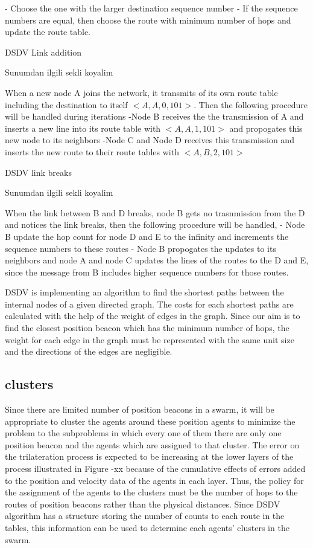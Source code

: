 \documentclass[twoside]{article}
\begin{document}
	- Choose the one with the larger destination sequence number
	- If the sequence numbers are equal, then choose the route with minimum number of hops and update the route table.
	
	DSDV Link addition
	
	Sunumdan ilgili sekli koyalim
	
	When a new node A joins the network, it transmits of its own route table including the destination to itself $<A,A,0,101>$. Then the following procedure will be handled during iterations
	-Node B receives the the transmission of A and inserts a new line into its route table with $<A,A,1,101>$ and propogates this new node to its neighbors
	-Node C and Node D receives this transmission and inserts the new route to their route tables with $<A,B,2,101>$
	
	
	DSDV link breaks
	
	Sunumdan ilgili sekli koyalim
	
	When the link between B and D breaks, node B gets no trasnmission from the D and notices the link breaks, then the following procedure will be handled,
	- Node B update the hop count for node D and E to the infinity and increments the sequence numbers to these routes 
	- Node B propogates the updates to its neighbors and node A and node C updates the lines of the routes to the D and E, since the message from B includes higher sequence numbers for those routes. 
	
	DSDV is implementing an algorithm to find the shortest paths between the internal nodes of a given directed graph. The costs for each shortest paths are calculated with the help of the weight of edges in the graph. Since our aim is to find the closest position beacon which has the minimum number of hops, the weight for each edge in the graph must be represented with the same unit size and the directions of the edges are negligible. 
	\subsection{clusters}
	Since there are limited number of position beacons in a swarm, it will be appropriate to cluster the agents around these position agents to minimize the problem to the subproblems in which every one of them there are only one position beacon and the agents which are assigned to that cluster. The error on the trilateration process is expected to be increasing at the lower layers of the process illustrated in Figure -xx because of the cumulative effects of errors added to the position and velocity data of the agents in each layer. Thus, the policy for the assignment of the agents to the clusters must be the number of hops to the routes of position beacons rather than the physical distances. Since DSDV algorithm has a structure storing the number of counts to each route in the tables, this information can be used to determine each agents' clusters in the swarm. 
	
\end{document}

